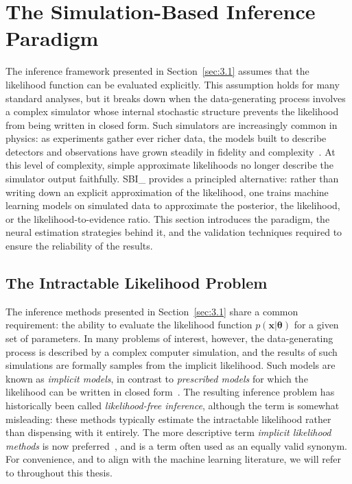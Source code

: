 \section{The Simulation-Based Inference Paradigm}
\label{sec:3.2}

The inference framework presented in Section~\ref{sec:3.1} assumes that the likelihood function can be evaluated explicitly.
This assumption holds for many standard analyses, but it breaks down when the data-generating process involves a complex simulator whose internal stochastic structure prevents the likelihood from being written in closed form.
Such simulators are increasingly common in physics: as experiments gather ever richer data, the models built to describe detectors and observations have grown steadily in fidelity and complexity~\cite{Cranmer:2020}. At this level of complexity, simple approximate likelihoods no longer describe the simulator output faithfully.
\Gls{SBI_} provides a principled alternative: rather than writing down an explicit approximation of the likelihood, one trains machine learning models on simulated data to approximate the posterior, the likelihood, or the likelihood-to-evidence ratio.
This section introduces the \SBI paradigm, the neural estimation strategies behind it, and the validation techniques required to ensure the reliability of the results.


\subsection{The Intractable Likelihood Problem}
\label{sec:3.2.1}

The inference methods presented in Section~\ref{sec:3.1} share a common requirement: the ability to evaluate the likelihood function $p(\mathbf{x}|\boldsymbol{\theta})$ for a given set of parameters.
In many problems of interest, however, the data-generating process is described by a complex computer simulation, and the results of such simulations are formally samples from the implicit likelihood.
Such models are known as \emph{implicit models}, in contrast to \emph{prescribed models} for which the likelihood can be written in closed form~\cite{Cranmer:2020,Diggle:1984}.
The resulting inference problem has historically been called \emph{likelihood-free inference}, although the term is somewhat misleading: these methods typically estimate the intractable likelihood rather than dispensing with it entirely.
The more descriptive term \emph{implicit likelihood methods} is now preferred~\cite{Cranmer:2020}, and \emph{\SBI} is a term often used as an equally valid synonym. For convenience, and to align with the machine learning literature, we will refer to \SBI throughout this thesis.

